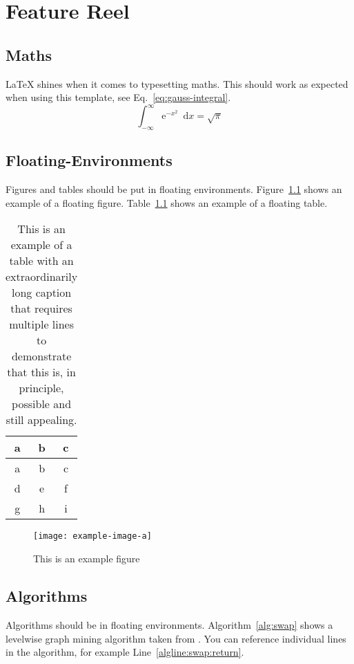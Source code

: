 \chapter{Feature Reel} 

\section{Maths}

\LaTeX{} shines when it comes to typesetting maths. This should work as expected when using this template, see Eq.~\eqref{eq:gauss-integral}. 
\begin{equation}\label{eq:gauss-integral}
	\int_{-\infty}^{\infty} \mathrm{e}^{-x^2} \enspace \mathrm{d}x = \sqrt{\pi} 
\end{equation}

\section{Floating-Environments} 

Figures and tables should be put in floating environments.
Figure~\ref{fig:example-fig} shows an example of a floating figure.
Table~\ref{tab:example-table} shows an example of a floating table.

\begin{table}[ht]
	\centering
	\begin{tabular}{ccc}
		\toprule
		a & b & c \\
		\midrule
		a & b & c \\
		d & e & f \\
		g & h & i \\
		\bottomrule
	\end{tabular}
	\caption{This is an example of a table with an extraordinarily long caption that requires multiple lines to demonstrate that this is, in principle, possible and still appealing.}
	\label{tab:example-table} 
\end{table}

\begin{figure}[ht]
	\centering 
	\texttt{[image: example-image-a]}
	\caption{This is an example figure} 
	\label{fig:example-fig} 
\end{figure}

\section{Algorithms} 
% 
Algorithms should be in floating environments. 
Algorithm~\ref{alg:swap} shows a levelwise graph mining algorithm taken from \cite{theoremofbenda}.
You can reference individual lines in the algorithm, for example Line~\ref{algline:swap:return}.

